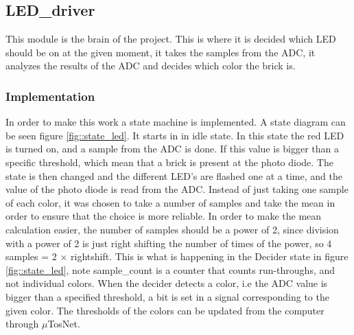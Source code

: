 \subsection{LED\_driver}
This module is the brain of the project. This is where it is decided which LED should be on at the given moment, it takes the samples from the ADC, it analyzes the results of the ADC and decides which color the brick is.

\subsubsection{Implementation}
In order to make this work a state machine is implemented. A state diagram can be seen figure \ref{fig::state_led}. It starts in in idle state. In this state the red LED is turned on, and a sample from the ADC is done. If this value is bigger than a specific threshold, which mean that a brick is present at the photo diode. The state is then changed and the different LED's are flashed one at a time, and the value of the photo diode is read from the ADC. Instead of just taking one sample of each color, it was chosen to take a number of samples and take the mean in order to ensure that the choice is more reliable. In order to make the mean calculation easier, the number of samples should be a power of 2, since division with a power of 2 is just right shifting the number of times of the power, so 4 samples = 2 $\times$ rightshift. This is what is happening in the Decider state in figure \ref{fig::state_led}, note sample\_count is a counter that counts run-throughs, and not individual colors. When the decider detects a color, i.e the ADC value is bigger than a specified threshold, a bit is set in a signal corresponding to the given color. The thresholds of the colors can be updated from the computer through $\mu$TosNet. 


